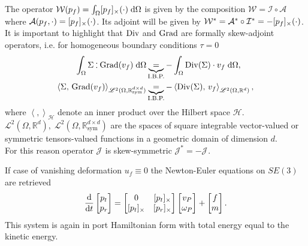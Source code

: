 The operator $\mathcal{W}(p_f) = \int_\Omega \crmat{p_f}(\cdot) \d{\Omega}$ is given by the composition $\mathcal{W} = \mathcal{I} \circ \mathcal{A}$ where $\mathcal{A}(p_f, \cdot) = [p_f]_{\times}(\cdot)$. Its adjoint will be given by $\mathcal{W}^* = \mathcal{A}^* \circ \mathcal{I}^*= - [p_f]_{\times}(\cdot)$.\\
It is important to highlight that $\operatorname*{Div}$ and $\operatorname*{Grad}$ are formally skew-adjoint operators, i.e. for homogeneous boundary conditions $\tau= 0$
\begin{align*}
\int_{\Omega} \Sigma \cddot \Grad(v_f) \d{\Omega} &\underbrace{=}_{\text{I.B.P.}} -\int_{\Omega} \Div(\Sigma) \cdot v_f \d{\Omega}, \\
\left\langle \Sigma, \, \Grad(v_f) \right\rangle_{\mathscr{L}^2(\Omega, \mathbb{R}^{d\times d}_{\text{sym}})} &\underbrace{=}_{\text{I.B.P.}} -\left\langle\Div(\Sigma), \, v_f \right\rangle_{\mathscr{L}^2(\Omega, \mathbb{R}^d)}, 
\end{align*}
where $\left\langle ,  \right\rangle_\mathscr{H}$ denote an inner product over the Hilbert space $\mathscr{H}$. \\
$\mathscr{L}^2(\Omega, \mathbb{R}^d), \; \mathscr{L}^2(\Omega, \mathbb{R}^{d\times d}_{\text{sym}})$ are the spaces of square integrable vector-valued or symmetric tensors-valued functions in a geometric domain of dimension $d$. \\
For this reason operator $\mathcal{J}_{}$ is skew-symmetric $\mathcal{J}_{}^* = - \mathcal{J}_{}$.

\begin{remark}
If case of vanishing deformation $u_f \equiv 0$ the Newton-Euler equations on $SE(3)$ \cite{ivancevic2011lecture} are retrieved
\begin{equation}
\diff{}{t}
\begin{bmatrix}
p_t \\ p_r \\
\end{bmatrix} = 
\begin{bmatrix}
	0 & \crmat{p_t}\\
	\crmat{p_t} & \crmat{p_r} \\
	\end{bmatrix}
\begin{bmatrix}
v_P \\ \omega_P  \\
\end{bmatrix} + 
\begin{bmatrix}
f \\ m \\
\end{bmatrix}.
\end{equation}
This system is again in port Hamiltonian form with total energy equal to the kinetic energy.
\end{remark}
